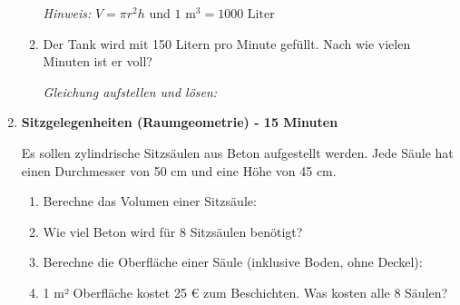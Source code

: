 \begin{enumerate}[label=\arabic*.,resume]
\begin{enumerate}[label=\alph*)]
        \textit{Hinweis:} $V = \pi r^2 h$ und $1 \text{ m}^3 = 1000 \text{ Liter}$

        \vspace{3cm}

        \item Der Tank wird mit 150 Litern pro Minute gefüllt. Nach wie vielen Minuten ist er voll?

        \textit{Gleichung aufstellen und lösen:}

        \vspace{3cm}

    \end{enumerate}

    \item \textbf{Sitzgelegenheiten (Raumgeometrie) - 15 Minuten}

    Es sollen zylindrische Sitzsäulen aus Beton aufgestellt werden. Jede Säule hat einen Durchmesser von 50 cm und eine Höhe von 45 cm.

    \begin{enumerate}[label=\alph*)]
        \item Berechne das Volumen einer Sitzsäule:

        \vspace{2cm}

        \item Wie viel Beton wird für 8 Sitzsäulen benötigt?

        \vspace{1.5cm}

        \item Berechne die Oberfläche einer Säule (inklusive Boden, ohne Deckel):

        \vspace{2.5cm}

        \item 1 m² Oberfläche kostet 25 € zum Beschichten. Was kosten alle 8 Säulen?

        \vspace{2cm}

    \end{enumerate}

\end{enumerate}